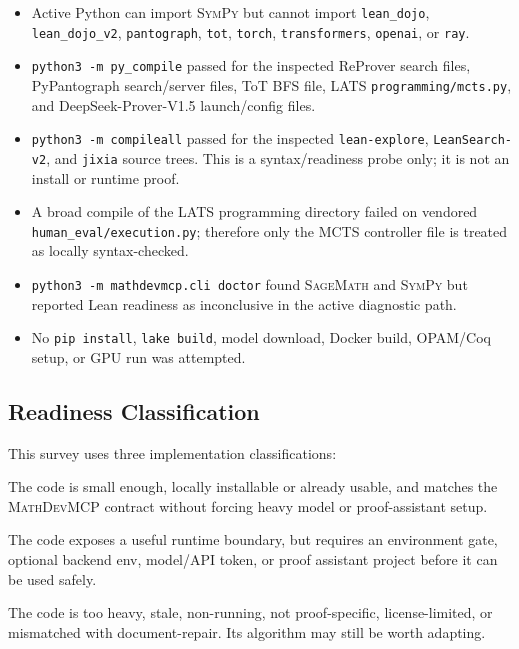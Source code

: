 \documentclass[11pt]{article}
\newcommand{\MathDevMCP}{\textsc{MathDevMCP}}
\newcommand{\Sage}{\textsc{SageMath}}
\newcommand{\SymPy}{\textsc{SymPy}}
\begin{document}
\begin{itemize}[leftmargin=*]
\item Active Python can import \SymPy{} but cannot import
  \texttt{lean\_dojo}, \texttt{lean\_dojo\_v2}, \texttt{pantograph},
  \texttt{tot}, \texttt{torch}, \texttt{transformers}, \texttt{openai}, or
  \texttt{ray}.
\item \texttt{python3 -m py\_compile} passed for the inspected ReProver
  search files, PyPantograph search/server files, ToT BFS file, LATS
  \texttt{programming/mcts.py}, and DeepSeek-Prover-V1.5 launch/config files.
\item \texttt{python3 -m compileall} passed for the inspected
  \texttt{lean-explore}, \texttt{LeanSearch-v2}, and \texttt{jixia} source
  trees. This is a syntax/readiness probe only; it is not an install or runtime
  proof.
\item A broad compile of the LATS programming directory failed on vendored
  \texttt{human\_eval/execution.py}; therefore only the MCTS controller file is
  treated as locally syntax-checked.
\item \texttt{python3 -m mathdevmcp.cli doctor} found \Sage{} and \SymPy{} but
  reported Lean readiness as inconclusive in the active diagnostic path.
\item No \texttt{pip install}, \texttt{lake build}, model download, Docker
  build, OPAM/Coq setup, or GPU run was attempted.
\end{itemize}

\subsection{Readiness Classification}

This survey uses three implementation classifications:

\begin{description}[style=nextline,leftmargin=0pt]
\item[Use directly.] The code is small enough, locally installable or already
usable, and matches the \MathDevMCP{} contract without forcing heavy model or
proof-assistant setup.
\item[Integrate/test against.] The code exposes a useful runtime boundary, but
requires an environment gate, optional backend env, model/API token, or proof
assistant project before it can be used safely.
\item[Not recommended as dependency.] The code is too heavy, stale, non-running,
not proof-specific, license-limited, or mismatched with document-repair. Its
algorithm may still be worth adapting.
\end{description}
\end{document}
